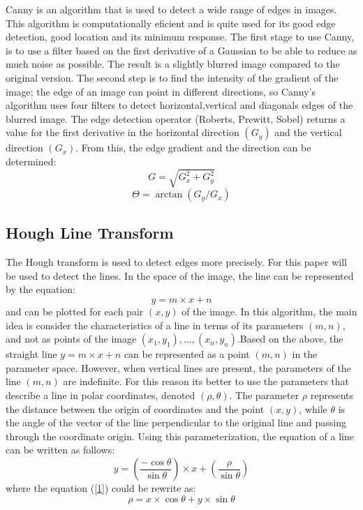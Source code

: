 \documentclass[conference]{IEEEtran}
\begin{document}
Canny is an algorithm that is used to detect a wide range of edges in images. This algorithm is computationally eficient and is quite used for its good edge detection, good location and its minimum response.
The first stage to use Canny, is to use a filter based on the first derivative of a Gaussian to be able to reduce as much noise as possible. The result is a slightly blurred image compared to the original version.
The second step is to find the intensity of the gradient of the image; the edge of an image can point in different directions, so Canny's algorithm uses four filters to detect horizontal,vertical and diagonals edges of the blurred image. The edge detection operator (Roberts, Prewitt, Sobel) returns a value for the first derivative in the horizontal direction $(G_{y})$ and the vertical direction $(G_{x})$. From this, the edge gradient and the direction can be determined:
\begin{equation}
G = \sqrt{G_{x}^{2} + G_{y}^2}
\end{equation}
\begin{equation}
\Theta = \arctan(G_{y}/G_{x})
\end{equation}
\subsection{Hough Line Transform}
The Hough transform is used to detect edges more precisely. For this paper will be used to detect the lines. In the space of the image, the line can be represented by the equation:
\begin{equation}
y = m \times x + n
\end{equation}
and can be plotted for each pair $(x,y)$ of the image. In this algorithm, the main idea is consider the characteristics of a line in terms of its parameters $(m,n)$, and not as points of the image $(x_{1},y_{1}),\ldots,(x_{n},y_{n})$.Based on the above, the straight line $y = m \times x + n$ can be represented as a point $(m,n)$ in the parameter space. However, when vertical lines are present, the parameters of the line $(m,n)$ are indefinite. For this reason its better to use the parameters that describe a line in polar coordinates, denoted $(\rho, \theta)$. The parameter $\rho$ represents the distance between the origin of coordinates and the point $(x,y)$, while $\theta$ is the angle of the vector of the line perpendicular to the original line and passing through the coordinate origin. Using this parameterization, the equation of a line can be written as follows:
\begin{equation}
\label{1}
y = (\frac{-\cos\theta}{\sin\theta})\times x + (\frac{\rho}{\sin\theta})
\end{equation}
where the equation (\ref{1}) could be rewrite as:
\begin{equation}
\label{2}
\rho = x \times \cos\theta + y \times \sin\theta
\end{equation}
\end{document}
